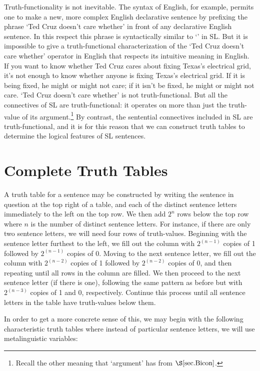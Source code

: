 Truth-functionality is not inevitable.
The syntax of English, for example, permits one to make a new, more complex English declarative sentence by prefixing the phrase `Ted Cruz doesn't care whether' in front of any declarative English sentence.
In this respect this phrase is syntactically similar to `\enot' in SL.
But it is impossible to give a truth-functional characterization of the `Ted Cruz doesn't care whether' operator in English that respects its intuitive meaning in English.
If you want to know whether Ted Cruz cares about fixing Texas's electrical grid, it's not enough to know whether anyone is fixing Texas's electrical grid.
If it is being fixed, he might or might not care; if it isn't be fixed, he might or might not care. 
`Ted Cruz doesn't care whether' is not truth-functional.
But all the connectives of SL are truth-functional: it operates on more than just the truth-value of its argument.\footnote{Recall the other meaning that `argument' has from $\S\ref{sec.Bicon}$.}
By contrast, the sentential connectives included in SL are truth-functional, and it is for this reason that we can construct truth tables to determine the logical features of SL sentences.



\section{Complete Truth Tables}

A truth table for a sentence may be constructed by writing the sentence in question at the top right of a table, and each of the distinct sentence letters immediately to the left on the top row.
We then add $2^n$ rows below the top row where $n$ is the number of distinct sentence letters. 
For instance, if there are only two sentence letters, we will need four rows of truth-values.
Beginning with the sentence letter furthest to the left, we fill out the column with $2^{(n-1)}$ copies of 1 followed by $2^{(n-1)}$ copies of 0.
Moving to the next sentence letter, we fill out the column with $2^{(n-2)}$ copies of 1 followed by $2^{(n-2)}$ copies of 0, and then repeating until all rows in the column are filled.
We then proceed to the next sentence letter (if there is one), following the same pattern as before but with $2^{(n-3)}$ copies of 1 and 0, respectively.
Continue this process until all sentence letters in the table have truth-values below them.

In order to get a more concrete sense of this, we may begin with the following characteristic truth tables where instead of particular sentence letters, we will use metalinguistic variables:

